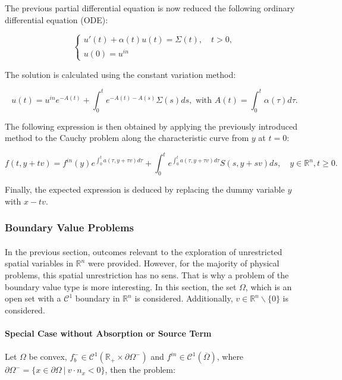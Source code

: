 \documentclass[a4paper, 11pt]{article}
\begin{document}
The previous partial differential equation is now reduced the following ordinary differential equation (ODE):

\[
\begin{cases}
u'(t)+\alpha(t)u(t)=\Sigma(t), \quad t>0,\\
u(0)=u^{in}
\end{cases}
\]

The solution is calculated using the constant variation method:

\[ u(t) = u^{in} e^{-A(t)} + \int_{0}^{t} e^{-A(t)-A(s)}\Sigma(s)ds, \text{ with } A(t)=\int_{0}^{t} \alpha (\tau) d\tau. \]

The following expression is then obtained by applying the previously introduced method to the Cauchy problem along the characteristic curve from $y$ at $t=0$:

\begin{equation}
f(t,y+tv) = f^{in}(y) e^{\int_{0}^{t}a(\tau,y+\tau v)d\tau} + \int_{0}^{t} e^{\int_{0}^{t}a(\tau,y+\tau v)d\tau}S(s,y+sv)ds, \quad y\in \mathbb{R}^n, t \geq 0.
\end{equation}

Finally, the expected expression is deduced by replacing the dummy variable $y$ with $x-tv$.

\subsubsection{Boundary Value Problems}

\paragraph{}
In the previous section, outcomes relevant to the exploration of unrestricted spatial variables in $\mathbb{R}^n$ were provided. However, for the majority of physical problems, this spatial unrestriction has no sens. That is why a problem of the boundary value type is more interesting. In this section, the set $\Omega$, which is an open set with a $\mathcal{C}^1$ boundary in $\mathbb{R}^n$ is considered. Additionally, $v \in \mathbb{R}^n\backslash \{0\}$ is considered.

\paragraph{Special Case without Absorption or Source Term}

\paragraph{}
Let $\Omega$ be convex, $f_b^- \in \mathcal{C}^1(\mathbb{R}_+ \times \partial \Omega^-)$ and $f^{in} \in \mathcal{C}^1(\overline{\Omega})$, where $\partial \Omega^- = \{x\in\partial \Omega~ | ~ v\cdot n_x<0\}$, then the problem:
\end{document}
